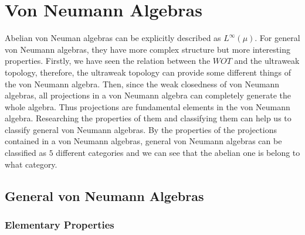 \documentclass[a4paper,11pt]{report}
\begin{document}
\chapter{Von Neumann Algebras}

Abelian von Neuman algebras can be explicitly described as $L^{\infty}(\mu)$. For general von Neumann algebras, they have more complex structure but more interesting properties. Firstly, we have seen the relation between the $WOT$ and the ultraweak topology, therefore, the ultraweak topology can provide some different things of the von Neumann algebra. Then, since the weak closedness of von Neumann algebras, all projections in a von Neumann algebra can completely generate the whole algebra. Thus projections are fundamental elements in the von Neumann algebra. Researching the properties of them and classifying them can help us to classify general von Neumann algebras. By the properties of the projections contained in a von Neumann algebras, general von Neumann algebras can be classified as $5$ different categories and we can see that the abelian one is belong to what category.

\section{General von Neumann Algebras}

\subsection{Elementary Properties}
\end{document}
